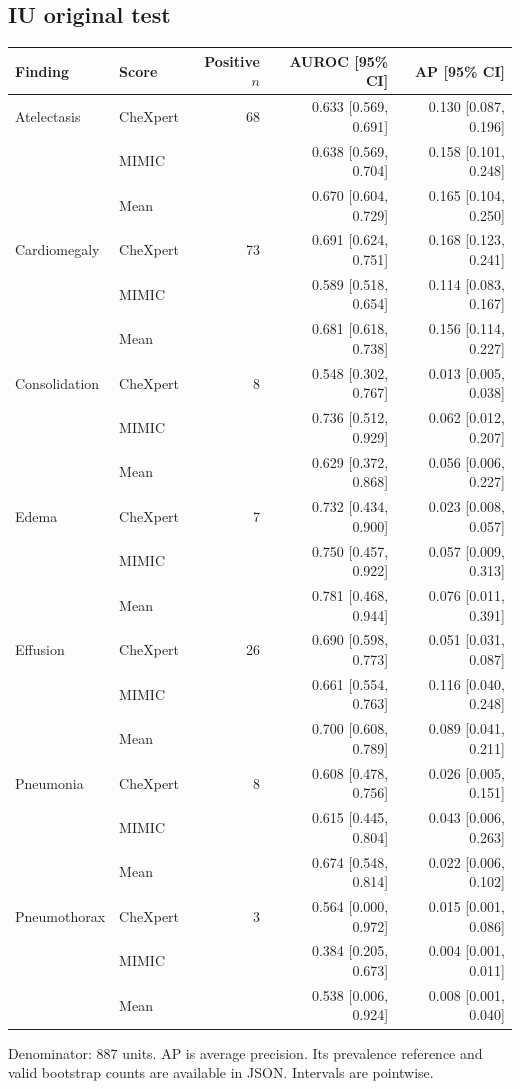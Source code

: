 \subsection*{IU original test}
\begin{center}\small\setlength{\tabcolsep}{4pt}
\begin{tabular}{llrrr}\toprule
Finding & Score & Positive $n$ & AUROC [95\% CI] & AP [95\% CI]\\\midrule
Atelectasis & CheXpert & 68 & 0.633 [0.569, 0.691] & 0.130 [0.087, 0.196] \\
 & MIMIC &  & 0.638 [0.569, 0.704] & 0.158 [0.101, 0.248] \\
 & Mean &  & 0.670 [0.604, 0.729] & 0.165 [0.104, 0.250] \\
Cardiomegaly & CheXpert & 73 & 0.691 [0.624, 0.751] & 0.168 [0.123, 0.241] \\
 & MIMIC &  & 0.589 [0.518, 0.654] & 0.114 [0.083, 0.167] \\
 & Mean &  & 0.681 [0.618, 0.738] & 0.156 [0.114, 0.227] \\
Consolidation & CheXpert & 8 & 0.548 [0.302, 0.767] & 0.013 [0.005, 0.038] \\
 & MIMIC &  & 0.736 [0.512, 0.929] & 0.062 [0.012, 0.207] \\
 & Mean &  & 0.629 [0.372, 0.868] & 0.056 [0.006, 0.227] \\
Edema & CheXpert & 7 & 0.732 [0.434, 0.900] & 0.023 [0.008, 0.057] \\
 & MIMIC &  & 0.750 [0.457, 0.922] & 0.057 [0.009, 0.313] \\
 & Mean &  & 0.781 [0.468, 0.944] & 0.076 [0.011, 0.391] \\
Effusion & CheXpert & 26 & 0.690 [0.598, 0.773] & 0.051 [0.031, 0.087] \\
 & MIMIC &  & 0.661 [0.554, 0.763] & 0.116 [0.040, 0.248] \\
 & Mean &  & 0.700 [0.608, 0.789] & 0.089 [0.041, 0.211] \\
Pneumonia & CheXpert & 8 & 0.608 [0.478, 0.756] & 0.026 [0.005, 0.151] \\
 & MIMIC &  & 0.615 [0.445, 0.804] & 0.043 [0.006, 0.263] \\
 & Mean &  & 0.674 [0.548, 0.814] & 0.022 [0.006, 0.102] \\
Pneumothorax & CheXpert & 3 & 0.564 [0.000, 0.972] & 0.015 [0.001, 0.086] \\
 & MIMIC &  & 0.384 [0.205, 0.673] & 0.004 [0.001, 0.011] \\
 & Mean &  & 0.538 [0.006, 0.924] & 0.008 [0.001, 0.040] \\
\bottomrule\end{tabular}\end{center}
\noindent Denominator: 887 units. AP is average precision. Its prevalence reference and valid bootstrap counts are available in JSON. Intervals are pointwise.
